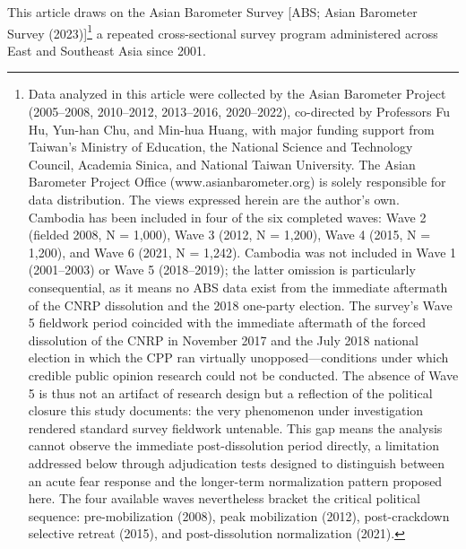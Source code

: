 \documentclass[
  12pt,
  letterpaper]{article}
\begin{document}
This article draws on the Asian Barometer Survey {[}ABS; Asian Barometer
Survey (2023){]}\footnote{Data analyzed in this article were collected
  by the Asian Barometer Project (2005--2008, 2010--2012, 2013--2016,
  2020--2022), co-directed by Professors Fu Hu, Yun-han Chu, and Min-hua
  Huang, with major funding support from Taiwan's Ministry of Education,
  the National Science and Technology Council, Academia Sinica, and
  National Taiwan University. The Asian Barometer Project Office
  (www.asianbarometer.org) is solely responsible for data distribution.
  The views expressed herein are the author's own. Cambodia has been
  included in four of the six completed waves: Wave 2 (fielded 2008, N =
  1,000), Wave 3 (2012, N = 1,200), Wave 4 (2015, N = 1,200), and Wave 6
  (2021, N = 1,242). Cambodia was not included in Wave 1 (2001--2003) or
  Wave 5 (2018--2019); the latter omission is particularly
  consequential, as it means no ABS data exist from the immediate
  aftermath of the CNRP dissolution and the 2018 one-party election. The
  survey's Wave 5 fieldwork period coincided with the immediate
  aftermath of the forced dissolution of the CNRP in November 2017 and
  the July 2018 national election in which the CPP ran virtually
  unopposed---conditions under which credible public opinion research
  could not be conducted. The absence of Wave 5 is thus not an artifact
  of research design but a reflection of the political closure this
  study documents: the very phenomenon under investigation rendered
  standard survey fieldwork untenable. This gap means the analysis
  cannot observe the immediate post-dissolution period directly, a
  limitation addressed below through adjudication tests designed to
  distinguish between an acute fear response and the longer-term
  normalization pattern proposed here. The four available waves
  nevertheless bracket the critical political sequence: pre-mobilization
  (2008), peak mobilization (2012), post-crackdown selective retreat
  (2015), and post-dissolution normalization (2021).} a repeated
cross-sectional survey program administered across East and Southeast
Asia since 2001.
\end{document}
